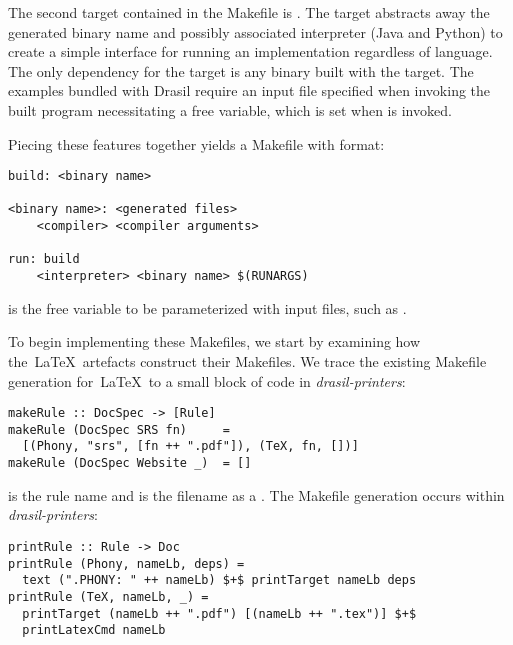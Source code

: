 {{{{{The second target contained in the Makefile is . The  target abstracts away the generated binary name and possibly associated interpreter (Java and Python) to create a simple interface for running an implementation regardless of language. The only dependency for the target is any binary built with the  target. The examples bundled with Drasil require an input file specified when invoking the built program necessitating a free variable, which is set when  is invoked. 

Piecing these features together yields a Makefile with format:

\begin{tcolorbox}
\begin{verbatim}
build: <binary name>

<binary name>: <generated files>
	<compiler> <compiler arguments>

run: build
	<interpreter> <binary name> $(RUNARGS)
\end{verbatim}
\end{tcolorbox}

 is the free variable to be parameterized with input files, such as .

To begin implementing these Makefiles, we start by examining how the\ \LaTeX\ artefacts construct their Makefiles. We trace the existing Makefile generation for\ \LaTeX\ to a small block of code in \textit{drasil-printers}:

\begin{tcolorbox}
\begin{verbatim}
makeRule :: DocSpec -> [Rule]
makeRule (DocSpec SRS fn)     = 
  [(Phony, "srs", [fn ++ ".pdf"]), (TeX, fn, [])]
makeRule (DocSpec Website _)  = []
\end{verbatim}
\end{tcolorbox}

 is the rule name and  is the filename as a . The Makefile generation occurs within \textit{drasil-printers}:

\begin{tcolorbox}
\begin{verbatim}
printRule :: Rule -> Doc
printRule (Phony, nameLb, deps) =
  text (".PHONY: " ++ nameLb) $+$ printTarget nameLb deps
printRule (TeX, nameLb, _) = 
  printTarget (nameLb ++ ".pdf") [(nameLb ++ ".tex")] $+$
  printLatexCmd nameLb
\end{verbatim}
\end{tcolorbox}

}}}}}
